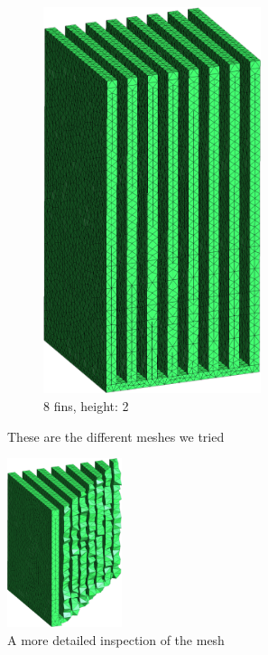 \begin{figure}[h t!]
\begin{subfigure}[t] {0.23\textwidth}
 \includegraphics[width=0.7\textwidth]{"../figures/mesh_8_2 (new)"}
 \caption{8 fins, height: 2}
 \label{fig:mesh_8_2}
 \end{subfigure}
 \caption{These are the different meshes we tried}
 \label{fig:meshes}
 \end{figure}

 \begin{figure}[h]
 \centering
 \includegraphics[width=0.3\textwidth]{"../figures/meshcut (new)"}
 \caption{A more detailed inspection of the mesh}
 \label{fig:meshcut}
 \end{figure}

